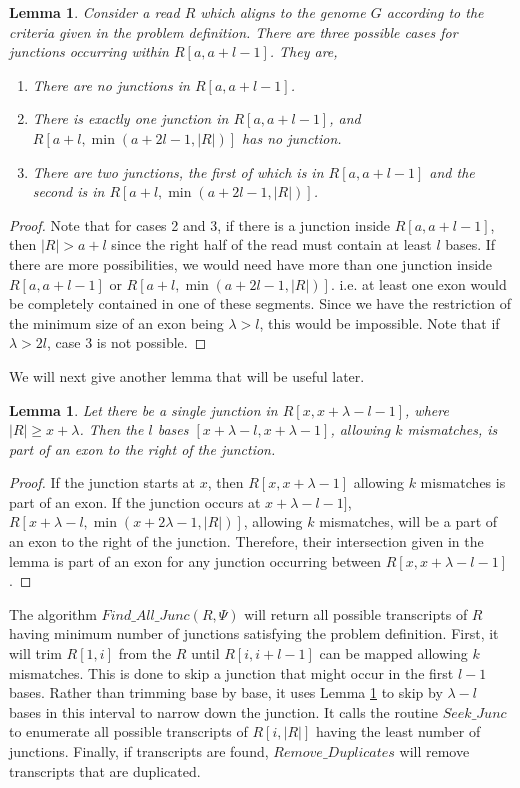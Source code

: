 \documentclass{article}
\newtheorem{lemma}[theorem]{Lemma}
\begin{document}
\begin{lemma}\label{lemma:cases}
Consider a read $R$ which aligns to the genome $G$ according to the criteria given in the problem definition.
There are three possible cases for junctions occurring within $R[a,a+l-1]$. They are,
\begin{enumerate}
\item There are no junctions in $R[a,a+l-1]$.
\item There is exactly one junction in $R[a,a+l-1]$, and $R[a+l,\min(a+2l-1,|R|)]$ has no junction.
\item There are two junctions, the first of which is in $R[a,a+l-1]$ and the second is in $R[a+l,\min(a+2l-1,|R|)]$. 
\end{enumerate}
\end{lemma}
\begin{proof}
	Note that for cases 2 and 3, if there is a junction inside $R[a,a+l-1]$, then $|R|>a+l$ since the right half of the read must contain at least $l$ bases.  If there are more possibilities, we would need have more than one junction inside $R[a,a+l-1]$ or $R[a+l,\min(a+2l-1,|R|)]$. i.e. at least one exon would be completely contained in one of these segments. Since we have the restriction of the minimum size of an exon being $\lambda>l$, this would be impossible. Note that if $\lambda>2l$, case 3 is not possible.
\end{proof}

We will next give another lemma that will be useful later. 
\begin{lemma}\label{lemma:two_junc}
	Let there be a single junction in $R[x,x+\lambda-l-1]$, where $|R|\geq x+\lambda$. Then the $l$ bases $[x+\lambda-l,x+\lambda-1]$, allowing $k$ mismatches, is part of an exon to the right of the junction.  
\end{lemma}
\begin{proof}
	If the junction starts at $x$, then $R[x,x+\lambda-1]$ allowing $k$ mismatches is part of an exon. If the junction occurs at $x+\lambda-l-1]$, $R[x+\lambda-l,\min(x+2\lambda-1,|R|)]$, allowing $k$ mismatches, will be a part of an exon to the right of the junction. Therefore, their intersection given in the lemma is part of an exon for any junction occurring between $R[x,x+\lambda-l-1]$.
\end{proof}

The algorithm $Find\_All\_Junc(R,\Psi)$ will return all possible transcripts of $R$ having minimum number of junctions satisfying the problem definition. First, it will trim $R[1,i]$ from the $R$ until $R[i,i+l-1]$ can be mapped allowing $k$ mismatches. This is done to skip a junction that might occur in the first $l-1$ bases. Rather than trimming base by base, it uses Lemma \ref{lemma:two_junc} to skip by $\lambda-l$ bases in this interval to narrow down the junction. It calls the routine $Seek\_Junc$ to enumerate all possible transcripts of $R[i,|R|]$ having the least number of junctions. Finally, if transcripts are found, $Remove\_Duplicates$ will remove transcripts that are duplicated. \\
\end{document}
